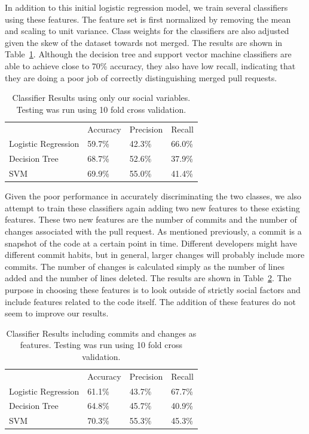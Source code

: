 \documentclass[12pt]{article}
\begin{document}
In addition to this initial logistic regression model, we train several
classifiers using these features. The feature set is first normalized by
removing the mean and scaling to unit variance. Class weights for the
classifiers are also adjusted given the skew of the dataset towards not merged.
The results are shown in Table~\ref{classifier_initial}. Although the decision
tree and support vector machine classifiers are able to achieve close to 70\%
accuracy, they also have low recall, indicating that they are doing a poor job
of correctly distinguishing merged pull requests.

\begin{table}[!htbp] \centering
\caption{Classifier Results using only our social variables. Testing was run using 10 fold cross validation.}
\label{classifier_initial}
\begin{tabular}{|l|l|l|l|}
\hline
~                   & Accuracy & Precision & Recall \\
    Logistic Regression & 59.7\%   & 42.3\%    & 66.0\% \\
    Decision Tree       & 68.7\%   & 52.6\%    & 37.9\% \\
    SVM                 & 69.9\%   & 55.0\%    & 41.4\% \\ \hline
\end{tabular}
\end{table}

Given the poor performance in accurately discriminating the two classes, we also
attempt to train these classifiers again adding two new features to these
existing features. These two new features are the number of commits and the
number of changes associated with the pull request. As mentioned previously, a
commit is a snapshot of the code at a certain point in time. Different
developers might have different commit habits, but in general, larger changes
will probably include more commits. The number of changes is calculated simply
as the number of lines added and the number of lines deleted. The results are
shown in Table~\ref{classifier_updated}. The purpose in choosing these features
is to look outside of strictly social factors and include features related to
the code itself. The addition of these features do not seem to improve our
results.

\begin{table}[!htbp] \centering
\caption{Classifier Results including commits and changes as features. Testing was run using 10 fold cross validation.}
\label{classifier_updated}
\begin{tabular}{|l|l|l|l|}
\hline
~                   & Accuracy & Precision & Recall \\
    Logistic Regression & 61.1\%   & 43.7\%    & 67.7\% \\
    Decision Tree       & 64.8\%   & 45.7\%    & 40.9\% \\
    SVM                 & 70.3\%   & 55.3\%    & 45.3\% \\ \hline
\end{tabular}
\end{table}
\end{document}
